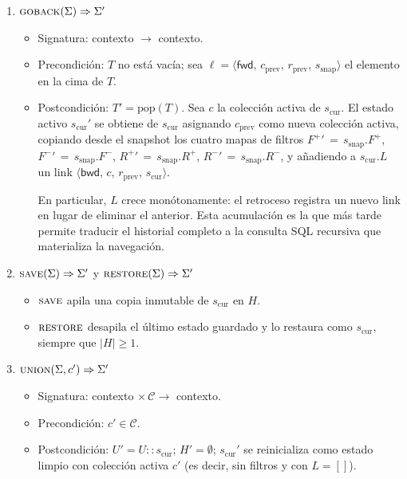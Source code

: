\begin{enumerate}
  \item $\textsc{goback}(\Sigma) \Rightarrow \Sigma'$
    \begin{itemize}
      \item Signatura: contexto $\to$ contexto.
      \item Precondición: $T$ no está vacía; sea
        $\ell = \langle \mathsf{fwd},\, c_{\text{prev}},\, r_{\text{prev}},\, s_{\text{snap}} \rangle$
        el elemento en la cima de $T$.
      \item Postcondición: $T' = \mathrm{pop}(T)$. Sea $c$ la colección activa de $s_{\text{cur}}$. El estado
        activo $s_{\text{cur}}'$ se obtiene de $s_{\text{cur}}$ asignando $c_{\text{prev}}$ como nueva
        colección activa, copiando desde el snapshot los cuatro mapas de filtros
        $F^{+}{}' \,{=}\, s_{\text{snap}}.F^{+}$, $F^{-}{}' \,{=}\, s_{\text{snap}}.F^{-}$,
        $R^{+}{}' \,{=}\, s_{\text{snap}}.R^{+}$, $R^{-}{}' \,{=}\, s_{\text{snap}}.R^{-}$, y añadiendo a $s_{\text{cur}}.L$
        un link $\langle \mathsf{bwd},\, c,\, r_{\text{prev}},\, s_{\text{cur}} \rangle$.

        En particular, $L$ crece monótonamente: el retroceso registra un nuevo link en lugar de eliminar el
        anterior. Esta acumulación es la que más tarde permite traducir el historial completo a la consulta
        SQL recursiva que materializa la navegación.
    \end{itemize}

  \item $\textsc{save}(\Sigma) \Rightarrow \Sigma'$ y $\textsc{restore}(\Sigma) \Rightarrow \Sigma'$
    \begin{itemize}
      \item $\textsc{save}$ apila una copia inmutable de $s_{\text{cur}}$ en $H$.
      \item $\textsc{restore}$ desapila el último estado guardado y lo restaura como $s_{\text{cur}}$, siempre
        que $|H| \geq 1$.
    \end{itemize}

  \item $\textsc{union}(\Sigma, c') \Rightarrow \Sigma'$
    \begin{itemize}
      \item Signatura: contexto $\times\, \mathcal{C} \to$ contexto.
      \item Precondición: $c' \in \mathcal{C}$.
      \item Postcondición: $U' = U \mathbin{::} s_{\text{cur}}$; $H' = \emptyset$; $s_{\text{cur}}'$ se
        reinicializa como estado limpio con colección activa $c'$ (es decir, sin filtros y con $L = []$).
    \end{itemize}
\end{enumerate}

